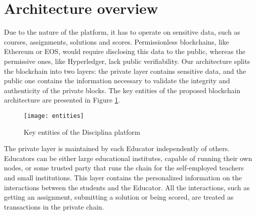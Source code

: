 \section{Architecture overview}
\label{sec:architecture}

Due to the nature of the platform, it has to operate on sensitive data, such as courses, assignments, solutions and scores. Permissionless blockchains, like Ethereum or EOS, would require disclosing this data to the public, whereas the permissive ones, like Hyperledger, lack public verifiability. Our architecture splits the blockchain into two layers: the private layer contains sensitive data, and the public one contains the information necessary to validate the integrity and authenticity of the private blocks. The key entities of the proposed blockchain architecture are presented in Figure \ref{fig:entities}.

\begin{figure}[ht]
\centering
\texttt{[image: entities]}
\caption{Key entities of the Disciplina platform}
\label{fig:entities}
\end{figure}

The private layer is maintained by each Educator independently of others. Educators can be either large educational institutes, capable of running their own nodes, or some trusted party that runs the chain for the self-employed teachers and small institutions. This layer contains the personalized information on the interactions between the students and the Educator. All the interactions, such as getting an assignment, submitting a solution or being scored, are treated as transactions in the private chain.

